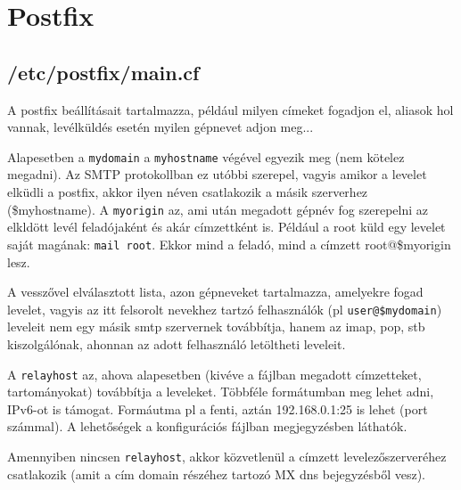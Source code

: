 \chapter{Postfix}

\section{/etc/postfix/main.cf}
A postfix beállításait tartalmazza, például milyen címeket fogadjon el, aliasok hol vannak, levélküldés esetén myilen
gépnevet adjon meg...



Alapesetben a \texttt{mydomain} a \texttt{myhostname} végével egyezik meg (nem kötelez megadni). Az SMTP protokollban
ez utóbbi szerepel, vagyis amikor a levelet elküdli a postfix, akkor ilyen néven csatlakozik a másik szerverhez
(\$myhostname). A \texttt{myorigin} az, ami után megadott gépnév fog szerepelni az elkldött levél feladójaként és akár
címzettként is. Például a root küld egy levelet saját magának: \texttt{mail root}. Ekkor mind a feladó, mind a címzett
root@\$myorigin lesz.

A  vesszővel elválasztott lista, azon gépneveket tartalmazza, amelyekre fogad levelet, vagyis az
itt felsorolt nevekhez tartzó felhasználók (pl \texttt{user@\$mydomain}) leveleit nem egy másik smtp szervernek
továbbítja, hanem az imap, pop, stb kiszolgálónak, ahonnan az adott felhasználó letöltheti leveleit.

A \texttt{relayhost} az, ahova alapesetben (kivéve a  fájlban megadott címzetteket,
tartományokat) továbbítja a leveleket. Többféle formátumban meg lehet adni, IPv6-ot is támogat. Formáutma pl a fenti,
aztán 192.168.0.1:25 is lehet (port számmal). A lehetőségek a konfigurációs fájlban megjegyzésben láthatók.

Amennyiben nincsen \texttt{relayhost}, akkor közvetlenül a címzett levelezőszerveréhez csatlakozik (amit a cím domain
részéhez tartozó MX dns bejegyzésből vesz).

